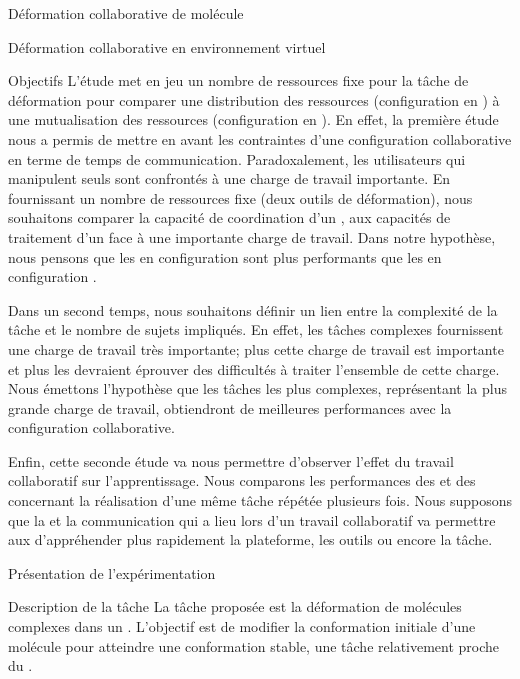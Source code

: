 \documentclass[myfrancais,ngerman,english,french]{mythesis}
\begin{document}
\begin{mychapter}{Déformation collaborative de molécule}
\begin{mysection}{Déformation collaborative en environnement virtuel}
\begin{mysubsection}{Objectifs}
				L'étude met en jeu un nombre de ressources fixe pour la tâche de déformation pour comparer une distribution des ressources (configuration  en ) à une mutualisation des ressources (configuration  en ).
				En effet, la première étude nous a permis de mettre en avant les contraintes d'une configuration collaborative en terme de temps de communication.
				Paradoxalement, les utilisateurs qui manipulent seuls sont confrontés à une charge de travail importante.
				En fournissant un nombre de ressources fixe (deux outils de déformation), nous souhaitons comparer la capacité de coordination d'un , aux capacités de traitement d'un  face à une importante charge de travail.
				Dans notre hypothèse, nous pensons que les  en configuration  sont plus performants que les  en configuration .

				Dans un second temps, nous souhaitons définir un lien entre la complexité de la tâche et le nombre de sujets impliqués.
				En effet, les tâches complexes fournissent une charge de travail très importante; plus cette charge de travail est importante et plus les  devraient éprouver des difficultés à traiter l'ensemble de cette charge.
				Nous émettons l'hypothèse que les tâches les plus complexes, représentant la plus grande charge de travail, obtiendront de meilleures performances avec la configuration collaborative.

				Enfin, cette seconde étude va nous permettre d'observer l'effet du travail collaboratif sur l'apprentissage.
				Nous comparons les performances des  et des  concernant la réalisation d'une même tâche répétée plusieurs fois.
				Nous supposons que la   et la communication qui a lieu lors d'un travail collaboratif va permettre aux  d'appréhender plus rapidement la plateforme, les outils ou encore la tâche.
			\end{mysubsection}
		\end{mysection}
		\begin{mysection}{Présentation de l'expérimentation}
			\begin{mysubsection}{Description de la tâche}
				La tâche proposée est la déformation de molécules complexes dans un .
				L'objectif est de modifier la conformation initiale d'une molécule pour atteindre une conformation stable, une tâche relativement proche du .


\end{mysubsection}
\end{mysection}
\end{mychapter}
\end{document}
